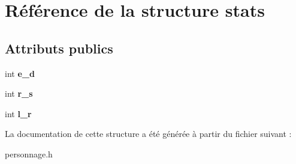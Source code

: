 \hypertarget{structstats}{}\section{Référence de la structure stats}
\label{structstats}
\subsection*{Attributs publics}
\begin{DoxyCompactItemize}
\item 
\mbox{\label{structstats_adaf1bb24116d3127367d6ca5320cbba8}} 
int {\bfseries e\+\_\+d}
\item 
\mbox{\label{structstats_aabe3a10b9174d0b342fed555fc824966}} 
int {\bfseries r\+\_\+s}
\item 
\mbox{\label{structstats_ad3fa3740a9f065a3888fb5d6a703c494}} 
int {\bfseries l\+\_\+r}
\end{DoxyCompactItemize}


La documentation de cette structure a été générée à partir du fichier suivant \+:\begin{DoxyCompactItemize}
\item 
personnage.\+h\end{DoxyCompactItemize}
